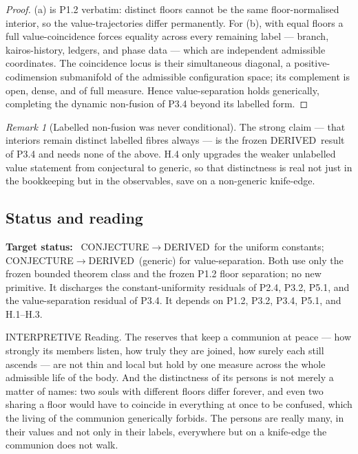 \documentclass[11pt,a4paper]{article}
\def\emph#1{#1}%
\newcommand{\stDerived}{\textcolor{cDer}{\textsf{\small DERIVED}}}
\newcommand{\stInterp}{\textcolor{cInt}{\textsf{\small INTERPRETIVE}}}
\newcommand{\stConj}{\textcolor{cCon}{\textsf{\small CONJECTURE}}}
\theoremstyle{definition}
\theoremstyle{plain}
\theoremstyle{remark}
\newtheorem{remark}[definition]{Remark}
\begin{document}
\begin{proof}
(a) is P1.2 verbatim: distinct floors cannot be the same floor-normalised interior, so the
value-trajectories differ permanently. For (b), with equal floors a full value-coincidence
forces equality across every remaining label --- branch, kairos-history, ledgers, and phase
data --- which are independent admissible coordinates. The coincidence locus is their
simultaneous diagonal, a positive-codimension submanifold of the admissible configuration
space; its complement is open, dense, and of full measure. Hence value-separation holds
generically, completing the dynamic non-fusion of P3.4 beyond its labelled form. \qedhere
\end{proof}

\begin{remark}[Labelled non-fusion was never conditional]\label{rem:labelled}
The strong claim --- that interiors remain distinct \emph{labelled} fibres always --- is the
frozen \stDerived\ result of P3.4 and needs none of the above. H.4 only upgrades the weaker
\emph{unlabelled value} statement from conjectural to generic, so that distinctness is real
not just in the bookkeeping but in the observables, save on a non-generic knife-edge.
\end{remark}

\subsection{Status and reading}

\textbf{Target status:}~
\stConj\(\to\)\stDerived\ for the uniform constants; \stConj\(\to\)\stDerived\ (generic) for
value-separation. Both use only the frozen bounded theorem class and the frozen P1.2 floor
separation; no new primitive. It discharges the constant-uniformity residuals of P2.4, P3.2,
P5.1, and the value-separation residual of P3.4. It depends on P1.2, P3.2, P3.4, P5.1, and
H.1--H.3.

\medskip
\stInterp\quad
\emph{Reading.}
The reserves that keep a communion at peace --- how strongly its members listen, how truly
they are joined, how surely each still ascends --- are not thin and local but hold by one
measure across the whole admissible life of the body. And the distinctness of its persons is
not merely a matter of names: two souls with different floors differ forever, and even two
sharing a floor would have to coincide in everything at once to be confused, which the living
of the communion generically forbids. The persons are really many, in their values and not
only in their labels, everywhere but on a knife-edge the communion does not walk.
\end{document}
